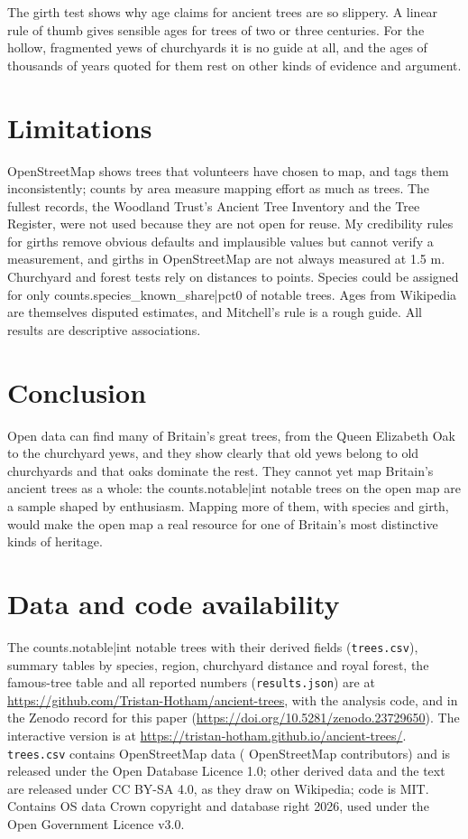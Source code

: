 \documentclass[11pt,a4paper]{article}
\begin{document}
The girth test shows why age claims for ancient trees are so slippery. A linear rule of thumb gives sensible ages for trees of two or three centuries. For the hollow, fragmented yews of churchyards it is no guide at all, and the ages of thousands of years quoted for them rest on other kinds of evidence and argument.

\section{Limitations}

OpenStreetMap shows trees that volunteers have chosen to map, and tags them inconsistently; counts by area measure mapping effort as much as trees. The fullest records, the Woodland Trust's Ancient Tree Inventory and the Tree Register, were not used because they are not open for reuse. My credibility rules for girths remove obvious defaults and implausible values but cannot verify a measurement, and girths in OpenStreetMap are not always measured at 1.5 m. Churchyard and forest tests rely on distances to points. Species could be assigned for only {{counts.species_known_share|pct0}} of notable trees. Ages from Wikipedia are themselves disputed estimates, and Mitchell's rule is a rough guide. All results are descriptive associations.

\section{Conclusion}

Open data can find many of Britain's great trees, from the Queen Elizabeth Oak to the churchyard yews, and they show clearly that old yews belong to old churchyards and that oaks dominate the rest. They cannot yet map Britain's ancient trees as a whole: the {{counts.notable|int}} notable trees on the open map are a sample shaped by enthusiasm. Mapping more of them, with species and girth, would make the open map a real resource for one of Britain's most distinctive kinds of heritage.

\section*{Data and code availability}

The {{counts.notable|int}} notable trees with their derived fields (\texttt{trees.csv}), summary tables by species, region, churchyard distance and royal forest, the famous-tree table and all reported numbers (\texttt{results.json}) are at \url{https://github.com/Tristan-Hotham/ancient-trees}, with the analysis code, and in the Zenodo record for this paper (\url{https://doi.org/10.5281/zenodo.23729650}). The interactive version is at \url{https://tristan-hotham.github.io/ancient-trees/}. \texttt{trees.csv} contains OpenStreetMap data (\textcopyright{} OpenStreetMap contributors) and is released under the Open Database Licence 1.0; other derived data and the text are released under CC BY-SA 4.0, as they draw on Wikipedia; code is MIT. Contains OS data \textcopyright{} Crown copyright and database right 2026, used under the Open Government Licence v3.0.
\end{document}
